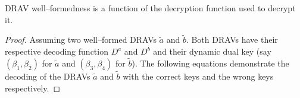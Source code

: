 \begin{lem}
  \label{lem:well-formed-fun-of-dec-fun}

  DRAV well--formedness is a function of the decryption function used to decrypt
  it.

\end{lem}
\begin{proof}

  Assuming two well--formed DRAVs $\widetilde{a}$ and $\widetilde{b}$. Both
  DRAVs have their respective decoding function $D^a$ and $D^b$ and their
  dynamic dual key (say $(\beta_1, \beta_2)$ for $\widetilde{a}$ and
  $(\beta_3, \beta_4)$ for $\widetilde{b}$). The following equations demonstrate
  the decoding of the DRAVs $\widetilde{a}$ and $\widetilde{b}$ with the correct
  keys and the wrong keys respectively.


\end{proof}
